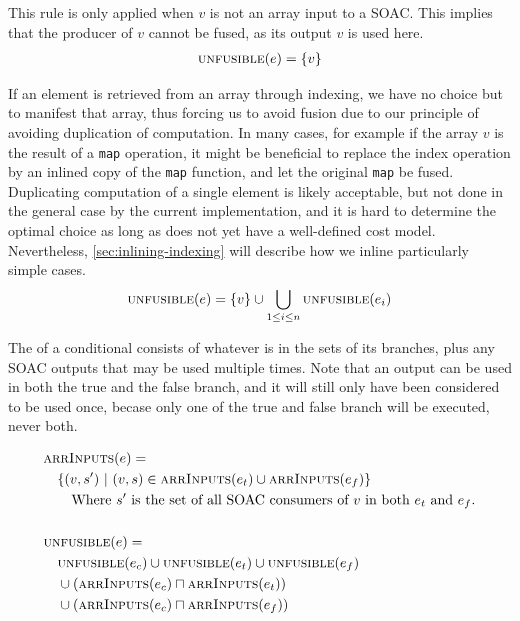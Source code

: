 \begin{description}[style=nextline]
\item[Case $e \equiv v$ ($v$ is a variable)]

  This rule is only applied when $v$ is not an array input to a SOAC.
  This implies that the producer of $v$ cannot be fused, as its output
  $v$ is used here.
\begin{align*}
  & \textsc{unfusible}(e) = \{v\} \\
\end{align*}

\item[Case $e \equiv \texttt{$v$[$e_{1}$, \ldots, $e_{n}$]}$]

  If an element is retrieved from an array through indexing, we have
  no choice but to manifest that array, thus forcing us to avoid
  fusion due to our principle of avoiding duplication of computation.
  In many cases, for example if the array $v$ is the result of a
  \texttt{map} operation, it might be beneficial to replace the index
  operation by an inlined copy of the \texttt{map} function, and let
  the original \texttt{map} be fused.  Duplicating computation of a
  single element is likely acceptable, but not done in the general
  case by the current implementation, and it is hard to determine the
  optimal choice as long as \LO{} does not yet have a well-defined
  cost model.  Nevertheless, \cref{sec:inlining-indexing} will
  describe how we inline particularly simple cases.
  \begin{align*}
  & \textsc{unfusible}(e) = \{v\} \cup \bigcup_{1\leq i \leq n}\textsc{unfusible}(e_{i}) \\
\end{align*}

\item[Case $e \equiv \texttt{if $e_{c}$ then $e_{t}$ else $e_{f}$}$]

  The \infusible{} of a conditional consists of whatever is in the
  \infusible{} sets of its branches, plus any SOAC outputs that may be
  used multiple times.  Note that an output can be used in both the
  true and the false branch, and it will still only have been
  considered to be used once, becase only one of the true and false
  branch will be executed, never both.


\begin{align*}
  & \textsc{arrInputs}(e) =\\
  & \quad \{ (v,s')\ |\ (v,s) \in \textsc{arrInputs}(e_{t}) \cup \textsc{arrInputs}(e_{f}) \}\\
  & \quad\quad \text{Where $s'$ is the set of all SOAC consumers of $v$ in both $e_{t}$ and $e_{f}$.} \\
  \\
  & \textsc{unfusible}(e) =\\
  & \quad \textsc{unfusible}(e_{c}) \cup \textsc{unfusible}(e_{t}) \cup \textsc{unfusible}(e_{f})\\
  & \quad \cup (\textsc{arrInputs}(e_{c}) \sqcap \textsc{arrInputs}(e_{t}))\\
  & \quad \cup (\textsc{arrInputs}(e_{c}) \sqcap \textsc{arrInputs}(e_{f}))\\
\end{align*}


\end{description}
